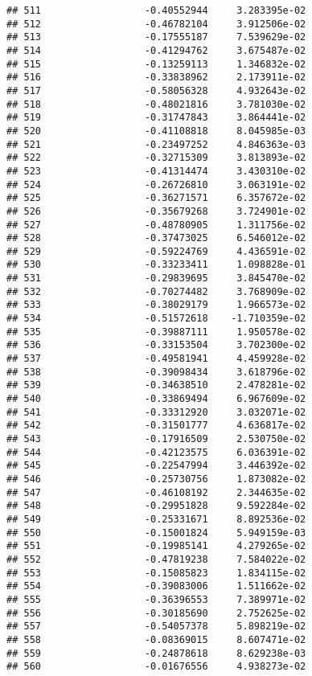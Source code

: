 \documentclass[
]{article}
\begin{document}
\begin{verbatim}
## 511                  -0.40552944     3.283395e-02
## 512                  -0.46782104     3.912506e-02
## 513                  -0.17555187     7.539629e-02
## 514                  -0.41294762     3.675487e-02
## 515                  -0.13259113     1.346832e-02
## 516                  -0.33838962     2.173911e-02
## 517                  -0.58056328     4.932643e-02
## 518                  -0.48021816     3.781030e-02
## 519                  -0.31747843     3.864441e-02
## 520                  -0.41108818     8.045985e-03
## 521                  -0.23497252     4.846363e-03
## 522                  -0.32715309     3.813893e-02
## 523                  -0.41314474     3.430310e-02
## 524                  -0.26726810     3.063191e-02
## 525                  -0.36271571     6.357672e-02
## 526                  -0.35679268     3.724901e-02
## 527                  -0.48780905     1.311756e-02
## 528                  -0.37473025     6.546012e-02
## 529                  -0.59224769     4.436591e-02
## 530                  -0.33233411     1.098828e-01
## 531                  -0.29839695     3.845470e-02
## 532                  -0.70274482     3.768909e-02
## 533                  -0.38029179     1.966573e-02
## 534                  -0.51572618    -1.710359e-02
## 535                  -0.39887111     1.950578e-02
## 536                  -0.33153504     3.702300e-02
## 537                  -0.49581941     4.459928e-02
## 538                  -0.39098434     3.618796e-02
## 539                  -0.34638510     2.478281e-02
## 540                  -0.33869494     6.967609e-02
## 541                  -0.33312920     3.032071e-02
## 542                  -0.31501777     4.636817e-02
## 543                  -0.17916509     2.530750e-02
## 544                  -0.42123575     6.036391e-02
## 545                  -0.22547994     3.446392e-02
## 546                  -0.25730756     1.873082e-02
## 547                  -0.46108192     2.344635e-02
## 548                  -0.29951828     9.592284e-02
## 549                  -0.25331671     8.892536e-02
## 550                  -0.15001824     5.949159e-03
## 551                  -0.19985141     4.279265e-02
## 552                  -0.47819238     7.584022e-02
## 553                  -0.15085823     1.834115e-02
## 554                  -0.39083006     1.511662e-02
## 555                  -0.36396553     7.389971e-02
## 556                  -0.30185690     2.752625e-02
## 557                  -0.54057378     5.898219e-02
## 558                  -0.08369015     8.607471e-02
## 559                  -0.24878618     8.629238e-03
## 560                  -0.01676556     4.938273e-02

\end{verbatim}
\end{document}
